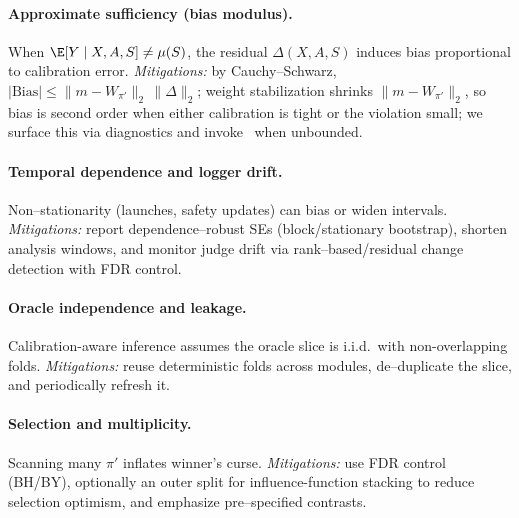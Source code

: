 \paragraph{Approximate sufficiency (bias modulus).}
When $\E[Y\mid X,A,S]\neq \mu(S)$, the residual $\Delta(X,A,S)$ induces bias proportional to calibration error.
\emph{Mitigations:} by Cauchy–Schwarz, $|\mathrm{Bias}|\le \|m-W_{\pi'}\|_2\,\|\Delta\|_2$; weight stabilization shrinks $\|m-W_{\pi'}\|_2$, so bias is second order when either calibration is tight or the violation small; we surface this via diagnostics and invoke \RefuseLevel\ when unbounded.

\paragraph{Temporal dependence and logger drift.}
Non–stationarity (launches, safety updates) can bias or widen intervals.
\emph{Mitigations:} report dependence–robust SEs (block/stationary bootstrap), shorten analysis windows, and monitor judge drift via rank–based/residual change detection with FDR control.

\paragraph{Oracle independence and leakage.}
Calibration-aware inference assumes the oracle slice is i.i.d.\ with non-overlapping folds.
\emph{Mitigations:} reuse deterministic folds across modules, de–duplicate the slice, and periodically refresh it.

\paragraph{Selection and multiplicity.}
Scanning many $\pi'$ inflates winner's curse.
\emph{Mitigations:} use FDR control (BH/BY), optionally an outer split for influence-function stacking to reduce selection optimism, and emphasize pre–specified contrasts.

